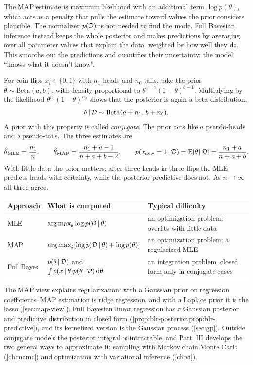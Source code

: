 The MAP estimate is maximum likelihood with an additional term $\log p(\theta)$, which acts as a penalty that pulls the estimate toward values the prior considers plausible. The normalizer $p(\mathcal{D})$ is not needed to find the mode. Full Bayesian inference instead keeps the whole posterior and makes predictions by averaging over all parameter values that explain the data, weighted by how well they do. This smooths out the predictions and quantifies their uncertainty: the model ``knows what it doesn't know''.

\begin{remark}\label{rem:beta-bernoulli}
For coin flips $x_i\in\{0,1\}$ with $n_1$ heads and $n_0$ tails, take the prior $\theta\sim\mathrm{Beta}(a,b)$, with density proportional to $\theta^{a-1}(1-\theta)^{b-1}$. Multiplying by the likelihood $\theta^{n_1}(1-\theta)^{n_0}$ shows that the posterior is again a beta distribution,
\[
\theta\,|\,\mathcal{D}\sim\mathrm{Beta}(a+n_1,\,b+n_0).
\]
A prior with this property is called \emph{conjugate}. The prior acts like $a$ pseudo-heads and $b$ pseudo-tails. The three estimates are
\[
\hat\theta_{\mathrm{MLE}}=\frac{n_1}{n},\qquad
\hat\theta_{\mathrm{MAP}}=\frac{n_1+a-1}{n+a+b-2},\qquad
p(x_{\mathrm{new}}=1\,|\,\mathcal{D})=\mathbb{E}[\theta\,|\,\mathcal{D}]=\frac{n_1+a}{n+a+b}.
\]
With little data the prior matters; after three heads in three flips the MLE predicts heads with certainty, while the posterior predictive does not. As $n\to\infty$ all three agree.
\end{remark}

\begin{center}
\small
\begin{tabularx}{\textwidth}{@{}l>{\raggedright\arraybackslash}X>{\raggedright\arraybackslash}X@{}}
\toprule
Approach & What is computed & Typical difficulty \\
\midrule
MLE & $\operatorname*{arg\,max}_\theta\log p(\mathcal{D}\,|\,\theta)$ & an optimization problem; overfits with little data \\
MAP & $\operatorname*{arg\,max}_\theta[\log p(\mathcal{D}\,|\,\theta)+\log p(\theta)]$ & an optimization problem; a regularized MLE \\
Full Bayes & $p(\theta\,|\,\mathcal{D})$ and $\int p(x\,|\,\theta)p(\theta\,|\,\mathcal{D})\,\mathrm{d}\theta$ & an integration problem; closed form only in conjugate cases \\
\bottomrule
\end{tabularx}
\end{center}

\begin{remark}[Connections]
The MAP view explains regularization: with a Gaussian prior on regression coefficients, MAP estimation is ridge regression, and with a Laplace prior it is the lasso (\cref{sec:map-view}). Full Bayesian linear regression has a Gaussian posterior and predictive distribution in closed form (\cref{prop:blr-posterior,prop:blr-predictive}), and its kernelized version is the Gaussian process (\cref{sec:gp}). Outside conjugate models the posterior integral is intractable, and Part~III develops the two general ways to approximate it: sampling with Markov chain Monte Carlo (\cref{ch:mcmc}) and optimization with variational inference (\cref{ch:vi}).
\end{remark}

